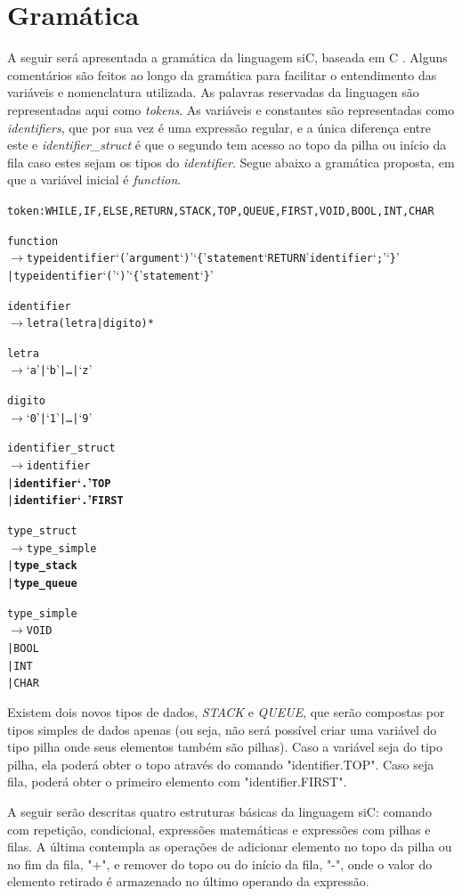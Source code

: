 \documentclass[12pt]{article}
\begin{document}
\section{Gramática}

\indent A seguir será apresentada a gramática da linguagem siC, baseada em C \cite{yacc}. Alguns comentários são feitos ao longo da gramática para facilitar o entendimento das variáveis e nomenclatura utilizada. As palavras reservadas da linguagen são representadas aqui como \textit{tokens}. As variáveis e constantes são representadas como \textit{identifiers}, que por sua vez é uma expressão regular, e a única diferença entre este e \textit{identifier\_struct} é que o segundo tem acesso ao topo da pilha ou início da fila caso estes sejam os tipos do \textit{identifier}. Segue abaixo a gramática proposta, em que a variável inicial é \textit{function}.

\begin{alltt}{\footnotesize

token: WHILE, IF, ELSE, RETURN, STACK, TOP, QUEUE, FIRST, VOID, BOOL, INT, CHAR

function
   \(\to\) type identifier `(' argument `)' `\{' statement `RETURN' identifier `;' `\}'
    | type identifier `(' `)' `\{' statement `\}'
    
identifier
   \(\to\) letra(letra | digito)*
    
letra
   \(\to\) `a' | `b' | \dots | `z'
    
digito
   \(\to\) `0' | `1' | \dots | `9'
	
identifier\_struct
   \(\to\) identifier
    | \textbf{identifier `.' TOP}
    | \textbf{identifier `.' FIRST}	
	
type\_struct
   \(\to\) type\_simple
    | \textbf{type\_stack}
    | \textbf{type\_queue}
    
type\_simple
   \(\to\) VOID
    | BOOL
    | INT
    | CHAR
   
}\end{alltt}
\indent Existem dois novos tipos de dados, \textit{STACK} e \textit{QUEUE}, que serão compostas por tipos simples de dados apenas (ou seja, não será possível criar uma variável do tipo pilha onde seus elementos também são pilhas). Caso a variável seja do tipo pilha, ela poderá obter o topo através do comando "identifier.TOP". Caso seja fila, poderá obter o primeiro elemento com "identifier.FIRST".

\indent A seguir serão descritas quatro estruturas básicas da linguagem siC: comando com repetição, condicional, expressões matemáticas e expressões com pilhas e filas. A última contempla as operações de adicionar elemento no topo da pilha ou no fim da fila, "+", e remover do topo ou do início da fila, "-", onde o valor do elemento retirado é armazenado no último operando da expressão.
\end{document}
